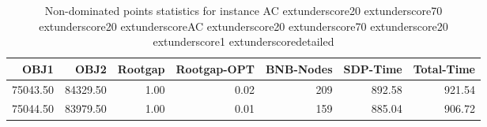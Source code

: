 \begin{table}
\caption{Non-dominated points statistics for instance AC	extunderscore20	extunderscore70	extunderscore20	extunderscoreAC	extunderscore20	extunderscore70	extunderscore20	extunderscore1	extunderscoredetailed}
\label{tab:stats/AC_20_70_20_AC_20_70_20_1_detailed}
\begin{tabular}{rrrrrrr}
\toprule
OBJ1 & OBJ2 & Rootgap & Rootgap-OPT & BNB-Nodes & SDP-Time & Total-Time \\
\midrule
75043.50 & 84329.50 & 1.00 & 0.02 & 209 & 892.58 & 921.54 \\
75044.50 & 83979.50 & 1.00 & 0.01 & 159 & 885.04 & 906.72 \\
\bottomrule
\end{tabular}
\end{table}
